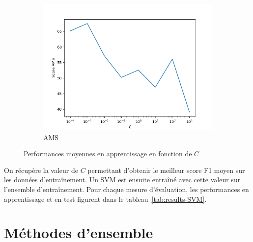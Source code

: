 \documentclass[12pt]{article}
\newcommand{\tabref}[1]{tableau~\ref{#1}}
\begin{document}
\begin{figure}[H]
    \begin{subfigure}[c]{0.45\textwidth}
        \includegraphics[width=\textwidth]{images/ams.png}
    \caption{AMS}
    \end{subfigure}

    \caption{Performances moyennes en apprentissage en fonction de $C$}
    \label{fig:svm-scores}
\end{figure}

On récupère la valeur de $C$ permettant d'obtenir le meilleur score F1 moyen sur
les données d'entraînement. Un SVM est ensuite entraîné avec cette valeur sur
l'ensemble d'entraînement. Pour chaque mesure d'évaluation, les performances en
apprentissage et en test figurent dans le \tabref{tab:results-SVM}.

\begin{table}[H]
\centering
{}
\caption{Scores obtenus en apprentissage et en test}
\label{tab:results-SVM}
\end{table}

\section{Méthodes d'ensemble}
\end{document}
